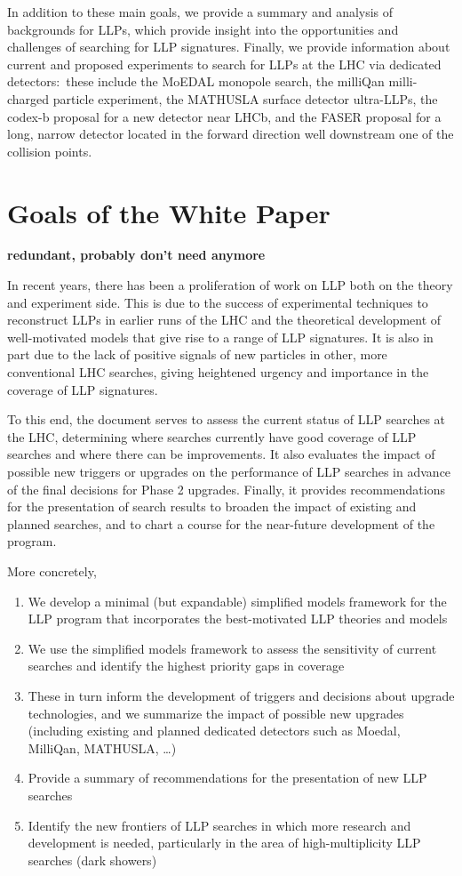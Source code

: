 %
In addition to these main goals, we provide a summary and analysis of backgrounds for LLPs, which provide insight into the opportunities and challenges of searching for LLP signatures. Finally, we provide information about current and proposed experiments to search for LLPs at the LHC via dedicated detectors:~these include the MoEDAL monopole search, the milliQan milli-charged particle experiment, the MATHUSLA surface detector ultra-LLPs, the codex-b proposal for a new detector near LHCb, and the FASER proposal for a long, narrow detector located in the forward direction well downstream one of the collision points.

\section{Goals of the White Paper}

{\bf redundant, probably don't need anymore}

In recent years, there has been a proliferation of work on LLP both on the theory and experiment side. This is due to the success of experimental techniques to reconstruct LLPs in earlier runs of the LHC and the theoretical development of well-motivated models that give rise to a range of LLP signatures. It is also in part due to the lack of positive signals of new particles in other, more conventional LHC searches, giving heightened urgency and importance in the coverage of LLP signatures.

To this end, the document serves to assess the current status of LLP searches at the LHC, determining where searches currently have good coverage of LLP searches and where there can be improvements. It also evaluates the impact of possible new triggers or upgrades on the performance of LLP searches in advance of the final decisions for Phase 2 upgrades. Finally, it provides recommendations for the presentation of search results to broaden the impact of existing and planned searches, and to chart a course for the near-future development of the program.

More concretely,
%
\begin{enumerate}
\item We develop a minimal (but expandable) simplified models framework for the LLP program that incorporates the best-motivated LLP theories and models
\item We use the simplified models framework to assess the sensitivity of current searches and identify the highest priority gaps in coverage
\item These in turn inform the development of triggers and decisions about upgrade technologies, and we summarize the impact of possible new upgrades (including existing and planned dedicated detectors such as Moedal, MilliQan, MATHUSLA, \dots)
\item Provide a summary of recommendations for the presentation of new LLP searches
\item Identify the new frontiers of LLP searches in which more research and development is needed, particularly in the area of high-multiplicity LLP searches (dark showers)
\end{enumerate}